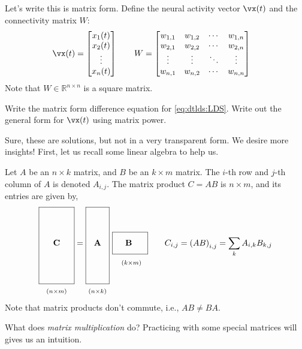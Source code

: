 \documentclass[a4paper,11pt]{exam}
\newcommand*{\clapp}[1]{\hbox to 0pt{\hss#1\hss}}
\newcommand*{\mat}[1]{\boldsymbol{\mathrm{#1}}}
\newcommand*{\subdims}[3]{\clapp{\raisebox{#1}[0pt][0pt]{$\scriptstyle(#2 \times #3)$}}}
\newcounter{ct}
\newcommand{\field}[1]{\ensuremath{\mathbb{#1}}}
\newcommand{\reals}{\field{R}}
\begin{document}
\begin{questions}
Let's write this is matrix form. Define the neural activity vector $\vx(t)$ and the connectivity matrix $W$:
\begin{align}
	\vx(t) &= 
	    \begin{bmatrix}
		x_1(t)\\
		x_2(t)\\
		\vdots\\
		x_n(t)
	    \end{bmatrix}
	\qquad
	W =
	    \begin{bmatrix}
		w_{1,1} & w_{1,2} & \cdots & w_{1,n}
		\\
		w_{2,1} & w_{2,2} & \cdots & w_{2,n}
		\\
		\vdots & \vdots & \ddots & \vdots
		\\
		w_{n,1} & w_{n,2} & \cdots & w_{n,n}
	    \end{bmatrix}
\end{align}
Note that $W \in \reals^{n \times n}$ is a square matrix.

\question Write the matrix form difference equation for \eqref{eq:dtlds:LDS}.
\question Write out the general form for $\vx(t)$ using matrix power.

Sure, these are solutions, but not in a very transparent form.
We desire more insights!
First, let us recall some linear algebra to help us.
\begin{tcolorbox}[colback=black!1!,title=Matrix multiplication]
Let $A$ be an $n \times k$ matrix, and $B$ be an $k \times m$ matrix.
The $i$-th row and $j$-th column of $A$ is denoted $A_{i,j}$.
The matrix product $C = AB$ is $n \times m$, and its entries are given by,
\begin{align}
    \framebox[1.5cm]{\clapp{\raisebox{0pt}[1.5cm][1.5cm]{$\mat C$}}\subdims{-2.0cm} n m} =
    \framebox[1.0cm]{\clapp{\raisebox{0pt}[1.5cm][1.5cm]{$\mat A$}}\subdims{-2.0cm} n k} \ 
    \framebox[1.5cm]{\clapp{\raisebox{0mm}[4.5mm][2.5mm]{$\mat B$}}       \subdims{-8mm} k m}
    \qquad
    C_{i,j} = \left(
    A
    B
    \right)_{i,j}
    =
    \sum_k A_{i,k} B_{k,j}
    \label{eq:matmult}
\end{align}
\\[3mm]
\noindent
Note that matrix products don't commute, i.e., $AB \neq BA$.
\end{tcolorbox}
\newpage
What does \emph{matrix multiplication} do?
Practicing with some special matrices will gives us an intuition.


\end{questions}
\end{document}
